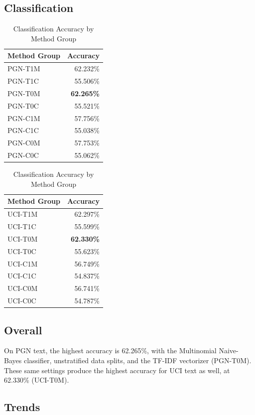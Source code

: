 \documentclass[conference]{IEEEtran}
\begin{document}
\subsection{Classification}
\begin{table}[]
\caption{Classification Accuracy by Method Group}
\centering
\begin{tabular}{lr}
\hline\hline
Method Group & Accuracy \\ [0.5ex]
\hline
PGN-T1M & 62.232\% \\
PGN-T1C & 55.506\% \\
PGN-T0M & \textbf{62.265\%} \\
PGN-T0C & 55.521\% \\
PGN-C1M & 57.756\% \\
PGN-C1C & 55.038\% \\
PGN-C0M & 57.753\% \\
PGN-C0C & 55.062\% \\ [1ex]
\hline
\end{tabular}
\begin{tabular}{lr}
\hline\hline
Method Group & Accuracy \\ [0.5ex]
\hline
UCI-T1M & 62.297\% \\
UCI-T1C & 55.599\% \\
UCI-T0M & \textbf{62.330\%} \\
UCI-T0C & 55.623\% \\
UCI-C1M & 56.749\% \\
UCI-C1C & 54.837\% \\
UCI-C0M & 56.741\% \\
UCI-C0C & 54.787\% \\ [1ex]
\hline
\end{tabular}
\label{class-results}
\end{table}

\subsection{Overall}

On PGN text, the highest accuracy is 62.265\%, with the Multinomial Naive-Bayes classifier, unstratified data splits, and the TF-IDF vectorizer (PGN-T0M). These same settings produce the highest accuracy for UCI text as well, at 62.330\% (UCI-T0M).

\subsection{Trends}
\end{document}
